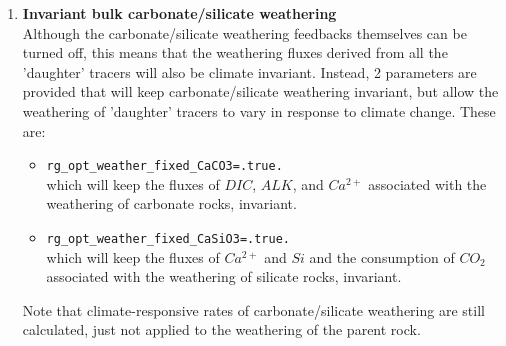 \begin{enumerate}[noitemsep]

\vspace{2mm}
\item \textbf{Invariant bulk carbonate/silicate weathering}
\\Although the carbonate/silicate weathering feedbacks themselves can be turned off, this means that the weathering fluxes derived from all the 'daughter' tracers will also be climate invariant. Instead, 2 parameters are provided that will keep carbonate/silicate weathering invariant, but allow the weathering of 'daughter' tracers to vary in response to climate change. These are:
\vspace{1mm}
\begin{itemize}[noitemsep]
\item \texttt{rg\_opt\_weather\_fixed\_CaCO3=.true.}
\\which will keep the fluxes of \(DIC\), \(ALK\), and \(Ca^{2+}\) associated with the weathering of carbonate rocks, invariant.
\item \texttt{rg\_opt\_weather\_fixed\_CaSiO3=.true.}
\\which will keep the fluxes of \(Ca^{2+}\) and \(Si\) and the consumption of \(CO_{2}\) associated with the weathering of silicate rocks, invariant.
\end{itemize}
\vspace{1mm}
Note that climate-responsive rates of carbonate/silicate weathering are still calculated, just not applied to the weathering of the parent rock.


\end{enumerate}
